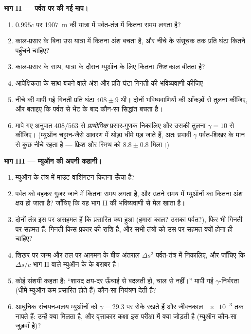 \begin{problem}[{सप्ताहांत समस्या --- म्युऑन, पर्वत की घड़ियाँ और
यह प्रमाण कि काल प्रसारित होता है}]
\medskip\noindent\textbf{भाग II --- पर्वत पर की गई माप।}
\begin{enumerate}[resume]
  \item $0.995c$ पर \qty{1907}{m} की यात्रा में पर्वत-तंत्र में
        कितना समय लगता है?
  \item काल-प्रसार के बिना उस यात्रा में कितना अंश बचता है, और
        नीचे के संसूचक तक प्रति घंटा कितने पहुँचने चाहिए?
  \item काल-प्रसार के साथ, यात्रा के दौरान म्युऑन के लिए कितना
        \emph{निज} काल बीतता है?
  \item आपेक्षिकता के साथ बचने वाले अंश और प्रति घंटा गिनती की
        भविष्यवाणी कीजिए।
  \item नीचे की मापी गई गिनती प्रति घंटा $408 \pm 9$ थी। दोनों
        भविष्यवाणियों की आँकड़ों से तुलना कीजिए, और बताइए कि पर्वत से
        भेंट के बाद कौन-सा सिद्धांत बचता है।
  \item मापे गए अनुपात $408/563$ से \emph{प्रायोगिक} प्रसार-गुणक
        निकालिए और उसकी तुलना $\gamma = 10$ से कीजिए। (म्युऑन
        चट्टान-जैसे आवरण में थोड़ा धीमे पड़ जाते हैं, अतः प्रभावी
        $\gamma$ पर्वत-शिखर के मान से कुछ नीचे रहता है --- फ़्रिश और
        स्मिथ को $8.8 \pm
        0.8$ मिला।)
\end{enumerate}

\medskip\noindent\textbf{भाग III --- म्युऑन की अपनी कहानी।}
\begin{enumerate}[resume]
  \item म्युऑन के तंत्र में माउंट वाशिंगटन कितना ऊँचा है?
  \item पर्वत को बहकर गुज़र जाने में कितना समय लगता है, और उतने समय में
        म्युऑनों का कितना अंश क्षय हो जाता है? जाँचिए कि यह
        भाग II की भविष्यवाणी से मेल खाता है।
  \item दोनों तंत्र इस पर असहमत हैं कि प्रसारित क्या हुआ (हमारा काल?
        उसका पर्वत?), फिर भी गिनती पर सहमत हैं: गिनती किस प्रकार की
        राशि है, और सभी तंत्रों को उस पर सहमत क्यों होना ही चाहिए?
  \item शिखर पर जन्म और तल पर आगमन के बीच अंतराल $\Delta s^2$
        पर्वत-तंत्र में निकालिए, और जाँचिए कि $\Delta s/c$ भाग II
        वाले म्युऑन के  के बराबर है।
  \item कोई संशयी कहता है: ``शायद क्षय-दर ऊँचाई से बदलती हो, चाल से
        नहीं।'' मापी गई $\gamma$-निर्भरता (धीमे म्युऑन कम प्रसारित
        होते हैं) कौन-सा नियंत्रण देती है?
  \item आधुनिक संचयन-वलय म्युऑनों को $\gamma = 29.3$ पर रोके रखते
        हैं और जीवनकाल $\num{e-3}$ तक नापते हैं: उन्हें क्या मिलता
        है, और वृत्ताकार कक्षा इस परीक्षा में क्या जोड़ती है (म्युऑन
        कौन-सा जुड़वाँ है)?
\end{enumerate}


\end{problem}
